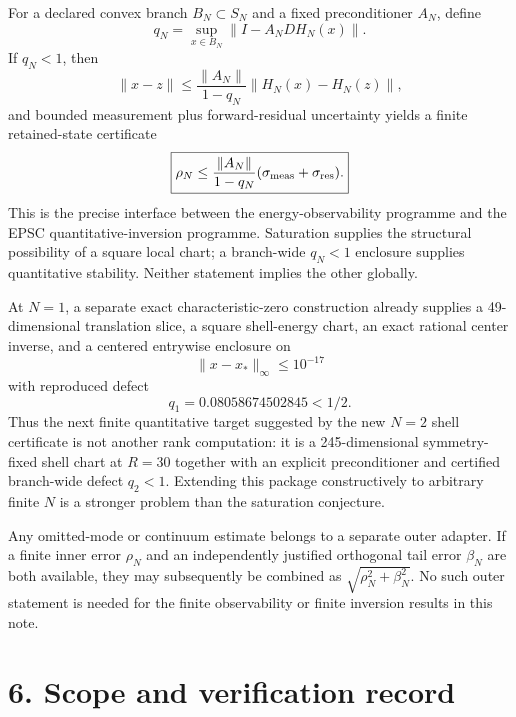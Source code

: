\documentclass[10pt,leqno,twoside]{article}
\theoremstyle{plain}
\theoremstyle{remark}
\begin{document}
For a declared convex branch $B_N\subset S_N$ and a fixed preconditioner $A_N$, define
\begin{equation}
q_N=\sup_{x\in B_N}\|I-A_NDH_N(x)\|.
\end{equation}
If $q_N<1$, then
\begin{equation}
\boxed{
\|x-z\|\le\frac{\|A_N\|}{1-q_N}\|H_N(x)-H_N(z)\|,
}
\end{equation}
and bounded measurement plus forward-residual uncertainty yields a finite retained-state
certificate
\begin{equation}
\boxed{
\rho_N\le\frac{\|A_N\|}{1-q_N}(\sigma_{\rm meas}+\sigma_{\rm res}).
}
\end{equation}
This is the precise interface between the energy-observability programme and the EPSC
quantitative-inversion programme.  Saturation supplies the structural possibility of a square
local chart; a branch-wide $q_N<1$ enclosure supplies quantitative stability.  Neither statement
implies the other globally.

At $N=1$, a separate exact characteristic-zero construction already supplies a 49-dimensional
translation slice, a square shell-energy chart, an exact rational center inverse, and a centered
entrywise enclosure on
\begin{equation}
\|x-x_*\|_\infty\le10^{-17}
\end{equation}
with reproduced defect
\begin{equation}
\boxed{q_1=0.08058674502845<1/2.}
\end{equation}
Thus the next finite quantitative target suggested by the new $N=2$ shell certificate is not
another rank computation: it is a 245-dimensional symmetry-fixed shell chart at $R=30$ together
with an explicit preconditioner and certified branch-wide defect $q_2<1$.  Extending this package
constructively to arbitrary finite $N$ is a stronger problem than the saturation conjecture.

Any omitted-mode or continuum estimate belongs to a separate outer adapter.  If a finite inner
error $\rho_N$ and an independently justified orthogonal tail error $\beta_N$ are both available,
they may subsequently be combined as $\sqrt{\rho_N^2+\beta_N^2}$.  No such outer statement is
needed for the finite observability or finite inversion results in this note.

\section*{6. Scope and verification record}
\end{document}
